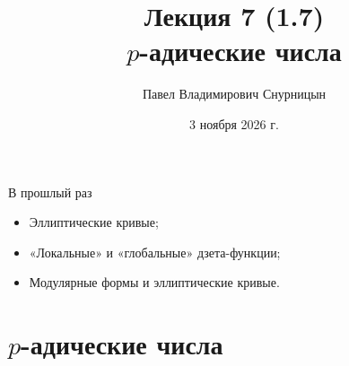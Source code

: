 \documentclass[serif, aspectratio=169]{beamer}
\author{Павел Владимирович Снурницын}
\title{Лекция 7 (1.7)\\ $p$-адические числа}
\institute{к.ф.-м.н., с.н.с., ИБ ВМК}
\date{\small 3 ноября 2026 г.}
\begin{document}
\begin{frame}
    \titlepage
\end{frame}
\note{}

\begin{frame}{В прошлый раз}
    \begin{itemize}
            \item Эллиптические кривые;
            \item «Локальные» и «глобальные» дзета-функции;
            \item Модулярные формы и эллиптические кривые.
    \end{itemize}
    \note{
        \begin{itemize}
            \item ---
        \end{itemize}
    }
\end{frame}

\section{$p$-адические числа}
\end{document}
